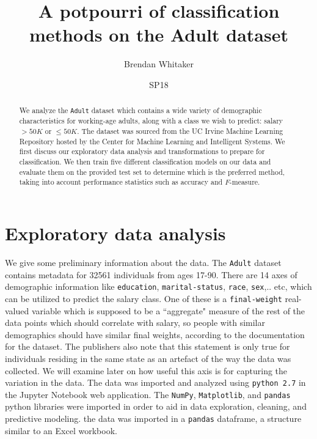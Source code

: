 \documentclass[11pt,oneside,reqno]{amsart}
\theoremstyle{plain}
\theoremstyle{definition}
\theoremstyle{remark}
\newcommand{\inlinecode}{\texttt}
\begin{document}
\begin{abstract}
We analyze the \inlinecode{Adult} dataset which contains a wide variety of demographic characteristics for working-age adults, along with a class we wish to predict: salary $>50K$ or $\leq 50K$. The dataset was sourced from the UC Irvine Machine Learning Repository hosted by the Center for Machine Learning and Intelligent Systems. We first discuss our exploratory data analysis and transformations to prepare for classification. We then train five different classification models on our data and evaluate them on the provided test set to determine which is the preferred method, taking into account performance statistics such as accuracy and $F$-measure. 
\end{abstract}
\title{A potpourri of classification methods on the Adult dataset}
\date{SP18}
\author[Brendan Whitaker]{Brendan Whitaker}
\maketitle
\tableofcontents

\section{Exploratory data analysis}

We give some preliminary information about the data. The \inlinecode{Adult} dataset contains metadata for 32561 individuals from ages 17-90. There are 14 axes of demographic information like \inlinecode{education}, \inlinecode{marital-status}, \inlinecode{race}, \inlinecode{sex},.. etc, which can be utilized to predict the salary class. One of these is a \inlinecode{final-weight} real-valued variable which is supposed to be a ``aggregate" measure of the rest of the data points which should correlate with salary, so people with similar demographics should have similar final weights, according to the documentation for the dataset. The publishers also note that this statement is only true for individuals residing in the same state as an artefact of the way the data was collected. We will examine later on how useful this axis is for capturing the variation in the data. The data was imported and analyzed using \inlinecode{python 2.7} in the Jupyter Notebook web application. The \inlinecode{NumPy}, \inlinecode{Matplotlib}, and \inlinecode{pandas} python libraries were imported in order to aid in data exploration, cleaning, and predictive modeling. the data was imported in a \inlinecode{pandas} dataframe, a structure similar to an Excel workbook. 
\end{document}
